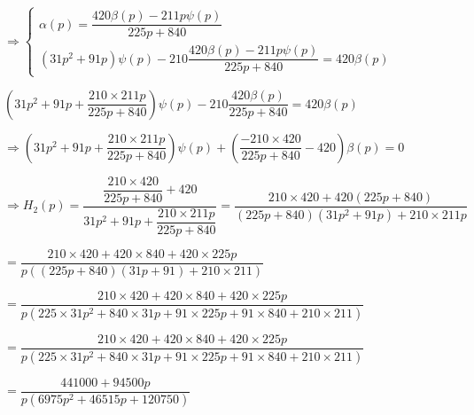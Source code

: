 \begin{multicols}{2}
\begin{corrige}
$
\Rightarrow \left\{
\begin{array}{l}
\alpha(p)=\dfrac{420\beta(p) - 211 p {\psi}(p)}{225p+840}\\
\left(31p^2+91p\right){\psi}(p)-210\dfrac{420\beta(p) - 211 p {\psi}(p)}{225p+840}=420\beta(p) 
\end{array}
\right. $

$\left(31p^2+91p + \dfrac{210\times 211p}{225p+840}\right){\psi}(p)-210\dfrac{420\beta(p)}{225p+840}=420\beta(p) $

$\Rightarrow \left(31p^2+91p + \dfrac{210\times 211p}{225p+840}\right){\psi}(p)+\left(\dfrac{-210\times 420}{225p+840}-420\right)\beta(p)=0 $

$\Rightarrow H_2(p) = \dfrac{\dfrac{210\times 420}{225p+840}+420}{31p^2+91p + \dfrac{210\times 211p}{225p+840}} 
 = \dfrac{210\times 420+420\left(225p+840\right)}{\left(225p+840\right)\left(31p^2+91p \right)+ 210\times 211p}   $

$ = \dfrac{210\times 420+420\times 840+420\times 225p}{p\left(\left(225p+840\right)\left(31p+91 \right)+ 210\times 211\right)}   $


$ = \dfrac{210\times 420+420\times 840+420\times 225p}{p\left(225\times 31 p^2 
+840\times 31 p + 91 \times 225 p+91\times 840 + 210\times 211\right)}   $

$ = \dfrac{210\times 420+420\times 840+420\times 225p}{p\left(225\times 31 p^2 
+840\times 31 p + 91 \times 225 p+91\times 840 + 210\times 211\right)}   $

$ = \dfrac{441000+94500p}{p\left(6975  p^2 
+46515 p+120750\right)}   $
\end{corrige}
\else
\fi




\ifprof
\else
\end{multicols}
\fi



